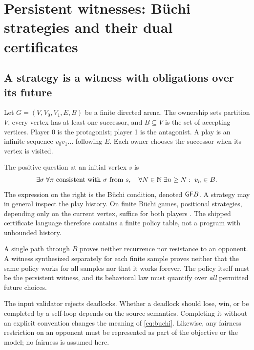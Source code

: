 \section{Persistent witnesses: B\"uchi strategies and their dual certificates}
\label{sec:games}


\subsection{A strategy is a witness with obligations over its future}
Let $G=(V,V_0,V_1,E,B)$ be a finite directed arena. The ownership sets partition
$V$, every vertex has at least one successor, and $B\subseteq V$ is the set of
accepting vertices. Player 0 is the protagonist; player 1 is the antagonist.
A play is an infinite sequence $v_0v_1\ldots$ following $E$. Each owner chooses
the successor when its vertex is visited.

The positive question at an initial vertex $s$ is
\begin{equation}
 \exists\sigma\;\forall\pi\text{ consistent with }\sigma\text{ from }s,
 \quad \forall N\in\mathbb{N}\;\exists n\geq N:\ v_n\in B.
 \label{eq:buchi}
\end{equation}
The expression on the right is the B\"uchi condition, denoted $\mathsf{GF} B$.
A strategy may in general inspect the play history. On finite B\"uchi games,
positional strategies, depending only on the current vertex, suffice for both
players \cite{chatterjee-henzinger}. The shipped certificate language therefore
contains a finite policy table, not a program with unbounded history.

A single path through $B$ proves neither recurrence nor resistance to an
opponent. A witness synthesized separately for each finite sample proves
neither that the same policy works for all samples nor that it works forever.
The policy itself must be the persistent witness, and its behavioral law must
quantify over \emph{all} permitted future choices.

The input validator rejects deadlocks. Whether a deadlock should lose, win, or
be completed by a self-loop depends on the source semantics. Completing it
without an explicit convention changes the meaning of \eqref{eq:buchi}.
Likewise, any fairness restriction on an opponent must be represented as part
of the objective or the model; no fairness is assumed here.

